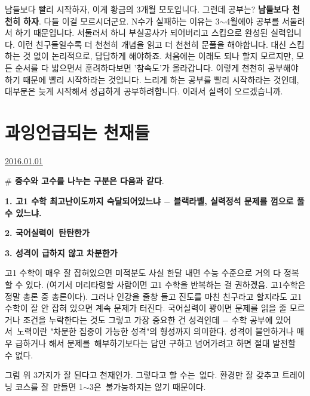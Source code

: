 남들보다 빨리 시작하자, 이게 황금의 3개월 모토입니다.
그런데 공부는? \textbf{남들보다 천천히 하자}. 다들 이걸 모르시더군요.
N수가 실패하는 이유는 3$\sim$4월에야 공부를 서둘러서 하기 때문입니다. 서둘러서 하니 부실공사가 되어버리고 스킵으로 완성된 실력입니다.
이런 친구들일수록 더 천천히 개념을 읽고 더 천천히 문풀을 해야합니다. 대신 스킵하는 것 없이 논리적으로, 답답하게 해야하죠.
처음에는 이래도 되나 할지 모르지만, 모든 순서를 다 밟으면서 훈려하다보면 '참속도'가 올라갑니다.
이렇게 천천히 공부해야하기 때문에 빨리 시작하라는 것입니다.
느리게 하는 공부를 빨리 시작하라는 것인데, 대부분은 늦게 시작해서 성급하게 공부하려합니다. 이래서 실력이 오르겠습니까.
\vspace{5mm}








\section{과잉언급되는 천재들}
\href{https://www.kockoc.com/Apoc/571900}{2016.01.01}

\vspace{5mm}

\textbf{$\#$ 중수와 고수를 나누는 구분은 다음과 같다}.
\vspace{5mm}

\item \textbf{1. 고1 수학 최고난이도까지 숙달되어있느냐 $-$ 블랙라벨, 실력정석 문제를 껌으로 풀 수 있느냐.}
\item \textbf{2. 국어실력이 탄탄한가}
\item \textbf{3. 성격이 급하지 않고 차분한가}
\vspace{5mm}

고1 수학이 매우 잘 잡혀있으면 미적분도 사실 한달 내면 수능 수준으로 거의 다 정복할 수 있다.
(여기서 머리타령할 사람이면 고1 수학을 반복하는 걸 권하겠음. 고1수학은 정말 총론 중 총론이다).
그러나 인강을 줄창 들고 진도를 마친 친구라고 할지라도 고1 수학이 잘 안 잡혀 있으면 계속 문제가 터진다.
국어실력이 꽝이면 문제를 읽을 줄 모르거나 조건을 누락한다는 것도 그렇고
가장 중요한 건 성격인데 $-$ 수학 공부에 있어서 노력이란 "차분한 집중이 가능한 성격"의 형성까지 의미한다.
성격이 불안하거나 매우 급하거나 해서 문제를 해부하기보다는 답만 구하고 넘어가려고 하면 절대 발전할 수 없다.
\vspace{5mm}

그럼 위 3가지가 잘 된다고 천재인가. 그렇다고 할 수는 없다.
환경만 잘 갖추고 트레이닝 코스를 잘 만들면 1$\sim$3은 불가능하지는 않기 때문이다.
\vspace{5mm}

